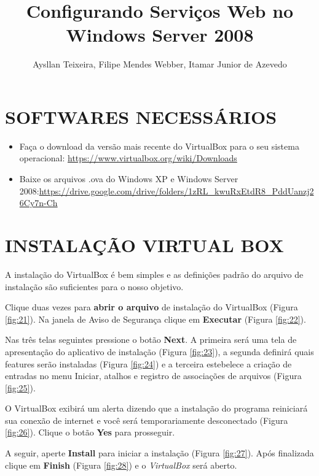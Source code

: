 \documentclass[10pt]{article}
\title{\Large{Configurando Serviços Web no Windows Server 2008}}
\author{Aysllan Teixeira, Filipe Mendes Webber, Itamar Junior de Azevedo}
\begin{document}
\maketitle

\newpage
\tableofcontents

\newpage
\section{SOFTWARES NECESSÁRIOS}
\begin{itemize}
    \item Faça o download da versão mais recente do VirtualBox para o seu sistema operacional: \url{https://www.virtualbox.org/wiki/Downloads}
    \item Baixe os arquivos .ova do Windows XP e Windows Server 2008:\newline \url{https://drive.google.com/drive/folders/1zRL_kwuRxEtdR8_PddUanzj26Cy7n-Ch}
\end{itemize}

\section{INSTALAÇÃO VIRTUAL BOX}

A instalação do VirtualBox é bem simples e as definições padrão do arquivo de instalação são suficientes para o nosso objetivo. 

\par Clique duas vezes para \textbf{abrir o arquivo} de instalação do VirtualBox (Figura \ref{fig:21}). Na janela de Aviso de Segurança clique em \textbf{Executar} (Figura \ref{fig:22}). 

\par Nas três telas seguintes pressione o botão \textbf{Next}. A primeira será uma tela de apresentação do aplicativo de instalação (Figura \ref{fig:23}), a segunda definirá quais features serão instaladas (Figura \ref{fig:24}) e a terceira estebelece a criação de entradas no menu Iniciar, atalhos e registro de associações de arquivos (Figura \ref{fig:25}).
\par O VirtualBox exibirá um alerta dizendo que a instalação do programa reiniciará sua conexão de internet e você será temporariamente desconectado (Figura \ref{fig:26}). Clique o botão \textbf{Yes} para prosseguir.

\par A seguir, aperte \textbf{Install} para iniciar a instalação (Figura \ref{fig:27}). Após finalizada clique em \textbf{Finish} (Figura \ref{fig:28}) e o \textit{VirtualBox} será aberto.
\end{document}
